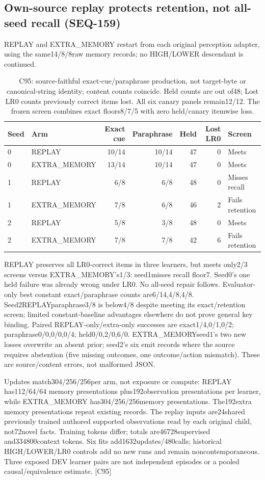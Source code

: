 \documentclass{article}
\begin{document}
\subsection{Own-source replay protects retention, not all-seed recall (SEQ-159)}
\label{sec:seq159-replay}
REPLAY and EXTRA\_MEMORY restart from each original perception adapter, using
the same14/8/8raw memory records; no HIGH/LOWER descendant is continued.
\begin{table}[htbp]
\centering\small
\begin{tabular}{llrrrrl}
\toprule
Seed & Arm & Exact cue & Paraphrase & Held & Lost LR0 & Screen \\
\midrule
0 & REPLAY & 10/14 & 10/14 & 47 & 0 & Meets \\
0 & EXTRA\_MEMORY & 13/14 & 10/14 & 47 & 0 & Meets \\
1 & REPLAY & 6/8 & 6/8 & 48 & 0 & Misses recall \\
1 & EXTRA\_MEMORY & 7/8 & 6/8 & 46 & 2 & Fails retention \\
2 & REPLAY & 5/8 & 3/8 & 48 & 0 & Meets \\
2 & EXTRA\_MEMORY & 7/8 & 7/8 & 42 & 6 & Fails retention \\
\bottomrule
\end{tabular}
\caption{C95: source-faithful exact-cue/paraphrase production, not target-byte
or canonical-string identity; content counts coincide. Held counts are out of48;
Lost LR0 counts previously correct items lost. All six canary panels remain12/12.
The frozen screen combines exact floors8/7/5 with zero held/canary itemwise loss.}
\label{tab:seq159-replay}
\end{table}
REPLAY preserves all LR0-correct items in three learners, but meets only2/3
screens versus EXTRA\_MEMORY's1/3: seed1misses recall floor7. Seed0's one held
failure was already wrong under LR0. No all-seed repair follows. Evaluator-only
best constant exact/paraphrase counts are6/14,4/8,4/8. Seed2REPLAYparaphrase3/8
is below4/8 despite meeting its exact/retention screen; limited constant-baseline
advantages elsewhere do not prove general key binding. Paired REPLAY-only/extra-only
successes are exact1/4,0/1,0/2; paraphrase0/0,0/0,0/4; held0/0,2/0,6/0.
EXTRA\_MEMORYseed1's two new losses overwrite an absent prior; seed2's six
emit records where the source requires abstention (five missing outcomes, one
outcome/action mismatch). These are source/content errors, not malformed JSON.

Updates match304/256/256per arm, not exposure or compute: REPLAY has112/64/64
memory presentations plus192observation presentations per learner, while
EXTRA\_MEMORY has304/256/256memory presentations. The192extra memory
presentations repeat existing records. The replay inputs are24shared previously
trained authored supported observations read by each original child, not72novel
facts. Training tokens differ; totals are46728supervised and334800context tokens.
Six fits add1632updates/480calls; historical HIGH/LOWER/LR0 controls add no new
runs and remain noncontemporaneous. Three exposed DEV learner pairs are not
independent episodes or a pooled causal/equivalence estimate. [C95]
\end{document}
